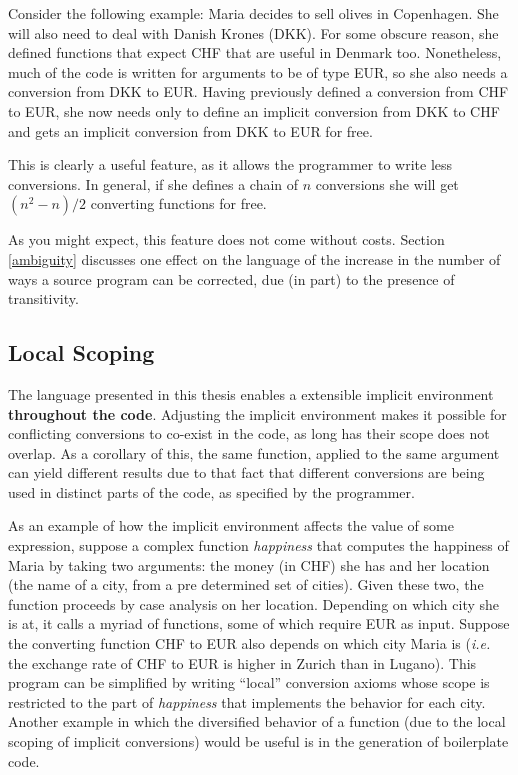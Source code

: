 Consider the following example: Maria decides to sell olives in Copenhagen. She will also need to deal with Danish Krones (DKK). For some obscure reason, she defined functions that expect CHF that are useful in Denmark too. Nonetheless, much of the code is written for arguments to be of type EUR, so she also needs a conversion from DKK to EUR. Having previously defined a conversion from CHF to EUR, she now needs only to define an implicit conversion from DKK to CHF and gets an implicit conversion from DKK to EUR for free. 

This is clearly a useful feature, as it allows the programmer to write less conversions. In general, if she defines a chain of $n$ conversions she will get $(n^2-n)/2$ converting functions for free.

As you might expect, this feature does not come without costs. Section \ref{ambiguity} discusses one effect on the language of the increase in the number of ways a source program can be corrected, due (in part) to the presence of transitivity.


\subsection{Local Scoping}
The language presented in this thesis enables a extensible implicit environment \textbf{throughout the code}. Adjusting the implicit environment makes it possible for conflicting conversions to co-exist in the code, as long has their scope does not overlap. As a corollary of this, the same function, applied to the same argument can yield different results due to that fact that different conversions are being used in distinct parts of the code, as specified by the programmer.

As an example of how the implicit environment affects the value of some expression, suppose a complex function \textit{happiness} that computes the happiness of Maria by taking two arguments: the money (in CHF) she has and her location (the name of a city, from a pre determined set of cities). Given these two, the function proceeds by case analysis on her location. Depending on which city she is at, it calls a myriad of functions, some of which require EUR as input. Suppose the converting function CHF to EUR also depends on which city Maria is (\textit{i.e.} the exchange rate of CHF to EUR is higher in Zurich than in Lugano). This program can be simplified by writing ``local'' conversion axioms whose scope is restricted to the part of \textit{happiness} that implements the behavior for each city. Another example in which the diversified behavior of a function (due to the local scoping of implicit conversions) would be useful is in the generation of boilerplate code.

